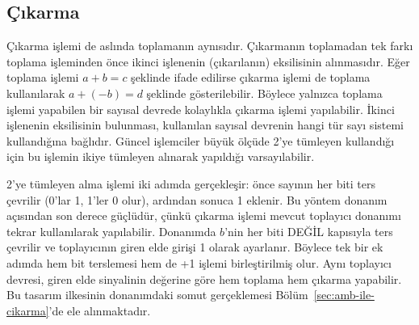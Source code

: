 \subsection{Çıkarma}

Çıkarma işlemi de aslında toplamanın aynısıdır. Çıkarmanın toplamadan tek farkı toplama işleminden önce ikinci işlenenin (çıkarılanın) eksilisinin alınmasıdır. Eğer toplama işlemi $a + b = c$ şeklinde ifade edilirse çıkarma işlemi de toplama kullanılarak $a + (-b) = d$ şeklinde gösterilebilir. Böylece yalnızca toplama işlemi yapabilen bir sayısal devrede kolaylıkla çıkarma işlemi yapılabilir. İkinci işlenenin eksilisinin bulunması, kullanılan sayısal devrenin hangi tür sayı sistemi kullandığına bağlıdır. Güncel işlemciler büyük ölçüde 2'ye tümleyen kullandığı için bu işlemin ikiye tümleyen alınarak yapıldığı varsayılabilir.

2'ye tümleyen alma işlemi iki adımda gerçekleşir: önce sayının her biti ters çevrilir (0'lar 1, 1'ler 0 olur), ardından sonuca 1 eklenir. Bu yöntem donanım açısından son derece güçlüdür, çünkü çıkarma işlemi mevcut toplayıcı donanımı tekrar kullanılarak yapılabilir. Donanımda $b$'nin her biti DEĞİL kapısıyla ters çevrilir ve toplayıcının giren elde girişi 1 olarak ayarlanır. Böylece tek bir ek adımda hem bit terslemesi hem de +1 işlemi birleştirilmiş olur. Aynı toplayıcı devresi, giren elde sinyalinin değerine göre hem toplama hem çıkarma yapabilir. Bu tasarım ilkesinin donanımdaki somut gerçeklemesi Bölüm~\ref{sec:amb-ile-cikarma}'de ele alınmaktadır.

